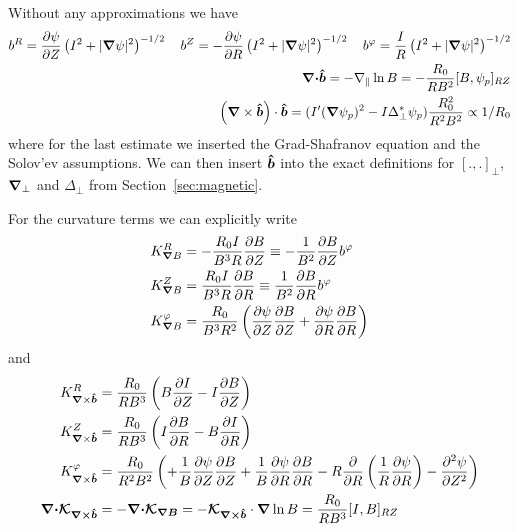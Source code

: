 Without any approximations we have
\begin{align}
b^R = {\frac{\partial \psi}{\partial Z}}\left(I^2+|{\boldsymbol{\nabla}}\psi|^2\right)^{-1/2} \quad
b^Z = -{\frac{\partial \psi}{\partial R}}\left(I^2+|{\boldsymbol{\nabla}}\psi|^2\right)^{-1/2} \quad 
b^\varphi = \frac{I}{R}\left(I^2+|{\boldsymbol{\nabla}}\psi|^2\right)^{-1/2} \\
{\boldsymbol{{\boldsymbol{\nabla}}\cdot}}\bm{\hat{b}} = -\nabla_\parallel \ln B = -\frac{R_0}{R B^2}[B,\psi_p]_{RZ} \\
\left({{\boldsymbol{\nabla}}\times\bm{\hat{b}}}\right) \cdot\bm{\hat{b}} =
    (I'({\boldsymbol{\nabla}}\psi_p)^2 - I \Delta_\perp^* \psi_p)\frac{ R_0^2}{R^2B^2} \propto 1/R_0
\label{}
\end{align}
where for the last
estimate we inserted the Grad-Shafranov equation and the Solov'ev assumptions.
We can then insert $\bm{\hat{b}}$ into the exact definitions for $[.,.]_\perp$, ${\boldsymbol{\nabla}}_{\perp}$ and $\Delta_\perp$ from Section~\ref{sec:magnetic}.

For the curvature terms we can explicitly write
\begin{align}
K_{{\boldsymbol{\nabla}} B}^R &= -\frac{R_0 I}{B^3R}\frac{\partial B}{\partial Z} \equiv -\frac{1}{B^2}\frac{\partial B}{\partial Z}b^\varphi \\
K_{{\boldsymbol{\nabla}} B}^Z &= \frac{R_0 I}{B^3R}\frac{\partial B}{\partial R}\equiv \frac{1}{B^2}\frac{\partial B}{\partial R}b^\varphi \\
K_{{\boldsymbol{\nabla}} B}^\varphi &= \frac{R_0}{B^3R^2}\left(
      \frac{\partial \psi}{\partial Z} \frac{\partial B}{\partial Z}
    + \frac{\partial \psi}{\partial R}\frac{\partial B}{\partial R}\right)
\label{}
\end{align}
and
\begin{align}
K_{{\boldsymbol{\nabla}}\times\bm{\hat{b}}}^R &= \frac{R_0 }{RB^3}\left( B\frac{\partial I}{\partial Z} -I\frac{\partial B}{\partial Z}\right) \\
K_{{\boldsymbol{\nabla}}\times\bm{\hat{b}}}^Z &= \frac{R_0 }{RB^3} \left( I\frac{\partial B}{\partial R} - B\frac{\partial I}{\partial R} \right)\\
K_{{\boldsymbol{\nabla}}\times\bm{\hat{b}}}^\varphi &= \frac{R_0}{R^2B^2}\left(
+ \frac{1}{B}\frac{\partial\psi}{\partial Z} \frac{\partial B}{\partial Z}
+ \frac{1}{B}\frac{\partial \psi}{\partial R}\frac{\partial B}{\partial R}
-R\frac{\partial}{\partial R}\left(\frac{1}{R}\frac{\partial\psi}{\partial R}\right) 
- \frac{\partial^2 \psi}{\partial Z^2}
\right) \\
{\boldsymbol{{\boldsymbol{\nabla}}\cdot}}{\boldsymbol{\mathcal K_{{\boldsymbol{\nabla}}\times\bm{\hat{b}}}}} &= -{\boldsymbol{{\boldsymbol{\nabla}}\cdot}}{\boldsymbol{\mathcal K_{{\boldsymbol{\nabla}} B}}}=
    -{\boldsymbol{\mathcal K_{{\boldsymbol{\nabla}}\times\bm{\hat{b}}}}}\cdot{\boldsymbol{\nabla}}\ln B = \frac{R_0}{RB^3}[I,B]_{RZ}
\label{}
\end{align}

